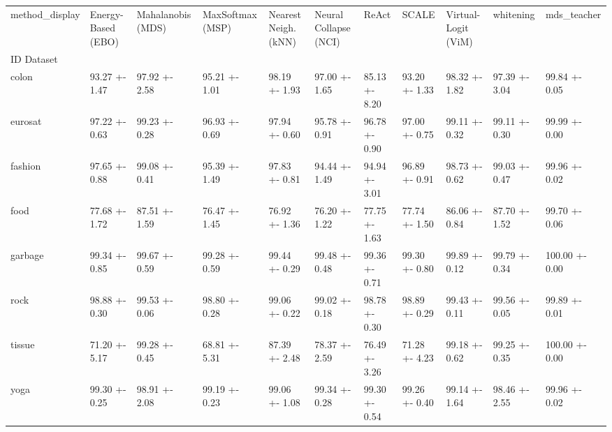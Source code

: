 \begin{tabular}{lllllllllll}
\toprule
method_display & Energy-Based (EBO) & Mahalanobis (MDS) & MaxSoftmax (MSP) & Nearest Neigh. (kNN) & Neural Collapse (NCI) & ReAct & SCALE & Virtual-Logit (ViM) & whitening & mds_teacher \\
ID Dataset &  &  &  &  &  &  &  &  &  &  \\
\midrule
colon & 93.27 +- 1.47 & 97.92 +- 2.58 & 95.21 +- 1.01 & 98.19 +- 1.93 & 97.00 +- 1.65 & 85.13 +- 8.20 & 93.20 +- 1.33 & 98.32 +- 1.82 & 97.39 +- 3.04 & 99.84 +- 0.05 \\
eurosat & 97.22 +- 0.63 & 99.23 +- 0.28 & 96.93 +- 0.69 & 97.94 +- 0.60 & 95.78 +- 0.91 & 96.78 +- 0.90 & 97.00 +- 0.75 & 99.11 +- 0.32 & 99.11 +- 0.30 & 99.99 +- 0.00 \\
fashion & 97.65 +- 0.88 & 99.08 +- 0.41 & 95.39 +- 1.49 & 97.83 +- 0.81 & 94.44 +- 1.49 & 94.94 +- 3.01 & 96.89 +- 0.91 & 98.73 +- 0.62 & 99.03 +- 0.47 & 99.96 +- 0.02 \\
food & 77.68 +- 1.72 & 87.51 +- 1.59 & 76.47 +- 1.45 & 76.92 +- 1.36 & 76.20 +- 1.22 & 77.75 +- 1.63 & 77.74 +- 1.50 & 86.06 +- 0.84 & 87.70 +- 1.52 & 99.70 +- 0.06 \\
garbage & 99.34 +- 0.85 & 99.67 +- 0.59 & 99.28 +- 0.59 & 99.44 +- 0.29 & 99.48 +- 0.48 & 99.36 +- 0.71 & 99.30 +- 0.80 & 99.89 +- 0.12 & 99.79 +- 0.34 & 100.00 +- 0.00 \\
rock & 98.88 +- 0.30 & 99.53 +- 0.06 & 98.80 +- 0.28 & 99.06 +- 0.22 & 99.02 +- 0.18 & 98.78 +- 0.30 & 98.89 +- 0.29 & 99.43 +- 0.11 & 99.56 +- 0.05 & 99.89 +- 0.01 \\
tissue & 71.20 +- 5.17 & 99.28 +- 0.45 & 68.81 +- 5.31 & 87.39 +- 2.48 & 78.37 +- 2.59 & 76.49 +- 3.26 & 71.28 +- 4.23 & 99.18 +- 0.62 & 99.25 +- 0.35 & 100.00 +- 0.00 \\
yoga & 99.30 +- 0.25 & 98.91 +- 2.08 & 99.19 +- 0.23 & 99.06 +- 1.08 & 99.34 +- 0.28 & 99.30 +- 0.54 & 99.26 +- 0.40 & 99.14 +- 1.64 & 98.46 +- 2.55 & 99.96 +- 0.02 \\
\bottomrule
\end{tabular}
